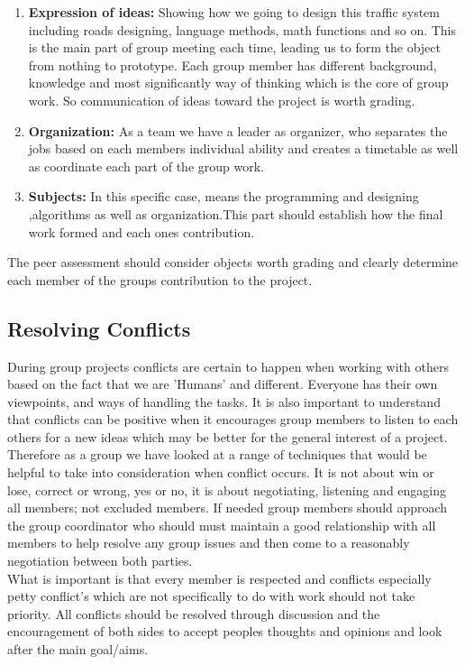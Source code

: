 \documentclass[a4paper,11pt]{article}
\begin{document}
\begin{enumerate}
\item \textbf{Expression of ideas:} Showing how we going to design this traffic system including roads designing, language methods, math functions and so on. This is the main part of group meeting each time, leading us to form the object from nothing to prototype. Each group member has different background, knowledge and most significantly way of thinking which is the core of group work. So communication of ideas toward the project is worth grading.  
\item \textbf{Organization:} As a team we have a leader as organizer, who separates the jobs based on each members individual ability and creates a timetable as well as coordinate each part of the group work.
\item \textbf{Subjects:} In this specific case, means the programming and designing ,algorithms as well as organization.This part should establish how the final work formed and each ones contribution.

\end{enumerate}
The peer assessment should consider objects worth grading and clearly determine each member of the groups contribution to the project.


\subsection{Resolving Conflicts}%
During group projects conflicts are certain to happen when working with others based on the fact that we are 'Humans' and different. Everyone has their own viewpoints, and ways of handling the tasks. It is also important to understand that conflicts can be positive when it encourages group members to listen to each others for a new ideas which may be better for the general interest of a project.\\Therefore as a group we have looked at a range of techniques that would be helpful to take into consideration when conflict occurs. It is not about win or lose, correct or wrong, yes or no, it is about negotiating, listening and engaging all members; not excluded members. If needed group members should approach the group coordinator who should must maintain a good relationship with all members to help resolve any group issues and then come to a reasonably negotiation between both parties. \\What is important is that every member is respected and conflicts especially petty conflict's which are not specifically to do with work should not take priority. All conflicts should be resolved through discussion and the encouragement of both sides to accept peoples thoughts and opinions and look after the main goal/aims. 
\end{document}
